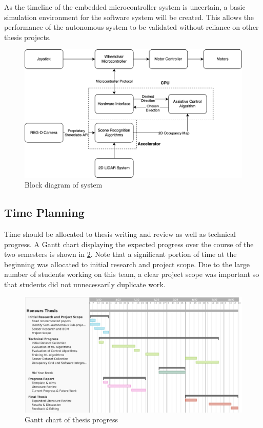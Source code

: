 As the timeline of the embedded microcontroller system is uncertain, a basic simulation environment for the software system will be created.
This allows the performance of the autonomous system to be validated without reliance on other thesis projects.
\begin{figure}[H]
    \centering
    \includegraphics[width=\linewidth]{images/block_diagram.png}
    \caption{Block diagram of system}
    \label{fig:block_diagram}
\end{figure}
\pagebreak

\subsection{Time Planning}
Time should be allocated to thesis writing and review as well as technical progress.
A Gantt chart displaying the expected progress over the course of the two semesters
is shown in \cref{fig:gantt_chart}. Note that a significant portion of time at the beginning was allocated
to initial research and project scope. Due to the large number of students working on this team,
a clear project scope was important so that students did not unnecessarily duplicate work.

\begin{figure}[H]
    \centering
    \includegraphics[width=\linewidth]{images/gantt_chart.png}
    \caption{Gantt chart of thesis progress}
    \label{fig:gantt_chart}
\end{figure}
